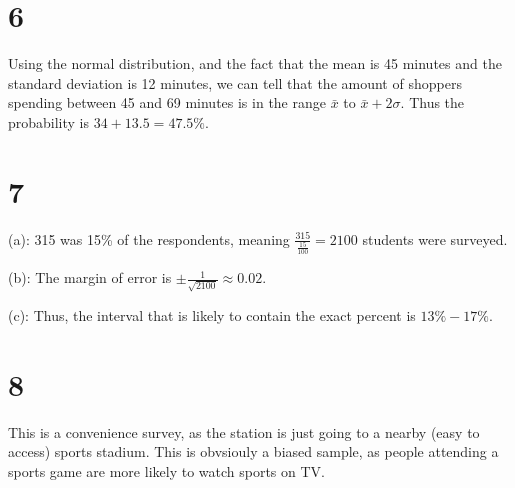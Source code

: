 \documentclass{article}
\theoremstyle{definition}
\newcommand{\?}{\stackrel{?}{=}}
\begin{document}
\section*{6}
Using the normal distribution, and the fact that the mean is 45 minutes and the standard deviation is 12 minutes, we can tell that the amount of shoppers spending 
between 45 and 69 minutes is in the range $\bar{x}$ to $\bar{x}+2\sigma$. Thus the probability is $34+13.5=47.5\%$.

\section*{7}
(a): 315 was 15\% of the respondents, meaning $\frac{315}{\frac{15}{100}}=2100$ students were surveyed.


(b): The margin of error is $\pm\frac{1}{\sqrt{2100}}\approx 0.02$.


(c): Thus, the interval that is likely to contain the exact percent is $13\%-17\%$.

\section*{8}
This is a convenience survey, as the station is just going to a nearby (easy to access) sports stadium. This is obvsiouly a biased sample, as people attending a sports 
game are more likely to watch sports on TV.
\end{document}
